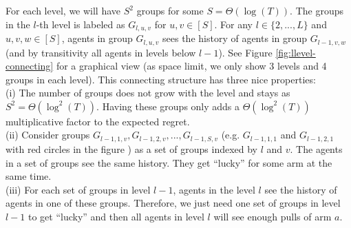 For each level, we will have $S^2$ groups for some $S = \Theta(\log(T))$. The groups in the $l$-th level is labeled as $G_{l,u,v}$ for $u,v\in[S]$. For any $l \in \{2,...,L\}$ and $u,v,w\in [S]$, agents in group $G_{l,u,v}$ sees the history of agents in group $G_{l-1,v,w}$ (and by transitivity all agents in levels below $l-1$). See Figure \ref{fig:llevel-connecting} for a graphical view (as space limit, we only show 3 levels and 4 groups in each level). This connecting structure has three nice properties: \\
(i) The number of groups does not grow with the level and stays as $S^2 = \Theta(\log^2(T))$.  Having these groups only adds a $\Theta(\log^2(T))$ multiplicative factor to the expected regret.\\
(ii) Consider groups $G_{l-1,1,v},G_{l-1,2,v},...,G_{l-1,S,v}$ (e.g. $G_{l-1,1,1}$ and $G_{l-1,2,1}$ with red circles in the figure ) as a set of groups indexed by $l$ and $v$. The agents in a set of groups see the same history. They get ``lucky'' for some arm at the same time.\\
(iii) For each set of groups in level $l-1$, agents in the level $l$ see the history of agents in one of these groups. Therefore, we just need one set of groups in level $l-1$ to get ``lucky'' and then all agents in level $l$ will see enough pulls of arm $a$. 

